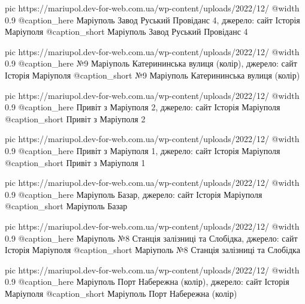   pic https://mariupol.dev-for-web.com.ua/wp-content/uploads/2022/12/%
  @width 0.9
  @caption_here Маріуполь Завод Руський Провіданс 4, джерело: сайт Історія Маріуполя
  @caption_short Маріуполь Завод Руський Провіданс 4

  pic https://mariupol.dev-for-web.com.ua/wp-content/uploads/2022/12/%
  @width 0.9
  @caption_here №9 Маріуполь Катерининська вулиця (колір), джерело: сайт Історія Маріуполя
  @caption_short №9 Маріуполь Катерининська вулиця (колір)

  pic https://mariupol.dev-for-web.com.ua/wp-content/uploads/2022/12/%
  @width 0.9
  @caption_here Привіт з Маріуполя 2, джерело: сайт Історія Маріуполя
  @caption_short Привіт з Маріуполя 2

  pic https://mariupol.dev-for-web.com.ua/wp-content/uploads/2022/12/%
  @width 0.9
  @caption_here Привіт з Маріуполя 1, джерело: сайт Історія Маріуполя
  @caption_short Привіт з Маріуполя 1

  pic https://mariupol.dev-for-web.com.ua/wp-content/uploads/2022/12/%
  @width 0.9
  @caption_here Маріуполь Базар, джерело: сайт Історія Маріуполя
  @caption_short Маріуполь Базар

  pic https://mariupol.dev-for-web.com.ua/wp-content/uploads/2022/12/%
  @width 0.9
  @caption_here Маріуполь №8 Станція залізниці та Слобідка, джерело: сайт Історія Маріуполя
  @caption_short Маріуполь №8 Станція залізниці та Слобідка

  pic https://mariupol.dev-for-web.com.ua/wp-content/uploads/2022/12/%
  @width 0.9
  @caption_here Маріуполь Порт Набережна (колір), джерело: сайт Історія Маріуполя
  @caption_short Маріуполь Порт Набережна (колір)

